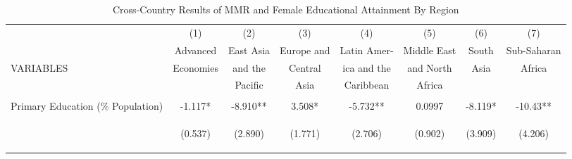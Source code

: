 \begin{subtables}\begin{landscape}\begin{table}[htpb!]\begin{center}\caption{Cross-Country Results of MMR and Female Educational Attainment By Region}\label{MMRtab:MMRregion}\begin{tabular}{lccccccc}\toprule&(1)&(2)&(3)&(4)&(5)&(6)&(7)\\&Advanced&East Asia&Europe and&Latin Amer-&Middle East&South&Sub-Saharan\\VARIABLES&Economies&and the&Central &ica and the&and North&Asia&Africa\\&&Pacific&Asia&Caribbean&Africa&&\\ \midrule 
 \vspace{4pt}&\begin{footnotesize}\end{footnotesize}&\begin{footnotesize}\end{footnotesize}&\begin{footnotesize}\end{footnotesize}&\begin{footnotesize}\end{footnotesize}&\begin{footnotesize}\end{footnotesize}&\begin{footnotesize}\end{footnotesize}&\begin{footnotesize}\end{footnotesize}\\Primary Education (\% Population) &-1.117*&-8.910**&3.508*&-5.732**&0.0997&-8.119*&-10.43**\\
&\begin{footnotesize}(0.537)\end{footnotesize}&\begin{footnotesize}(2.890)\end{footnotesize}&\begin{footnotesize}(1.771)\end{footnotesize}&\begin{footnotesize}(2.706)\end{footnotesize}&\begin{footnotesize}(0.902)\end{footnotesize}&\begin{footnotesize}(3.909)\end{footnotesize}&\begin{footnotesize}(4.206)\end{footnotesize}\\

\end{tabular}
\end{center}
\end{table}
\end{landscape}
\end{subtables}
